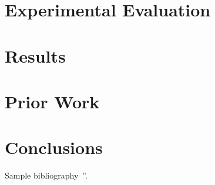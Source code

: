 \documentclass[12pt,letterpaper]{article}
\begin{document}
\section{Experimental Evaluation} \label{sec:evaluation}

\section{Results} \label{sec:results}

\section{Prior Work} \label{sec:prior_work}

\section{Conclusions} \label{sec:conclusions}


Sample bibliography~\cite{Authors11b}''.




{\small


}
\end{document}
